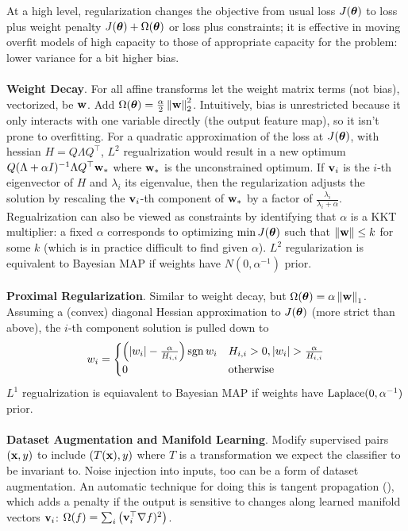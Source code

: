 \documentclass{article}
\begin{document}
At a high level, regularization changes the objective from usual loss $J({\boldsymbol\theta})$ to loss plus weight penalty $J({\boldsymbol\theta})+\Omega({\boldsymbol\theta})$ or loss plus constraints; it is effective in moving overfit models of high capacity to those of appropriate capacity for the problem: lower variance for a bit higher bias.
\\\\
\noindent
\textbf{Weight Decay}. For all affine transforms let the weight matrix terms (not bias), vectorized, be $\textbf{w}$. Add $\Omega({\boldsymbol\theta})=\frac{\alpha}{2}\left\| \textbf{w} \right\|_2^2$. Intuitively, bias is unrestricted because it only interacts with one variable directly (the output feature map), so it isn't prone to overfitting. For a quadratic approximation of the loss at $J({\boldsymbol\theta})$, with hessian $H=Q\Lambda Q^\top$, $L^2$ regualrization would result in a new optimum $Q(\Lambda+\alpha I)^{-1}\Lambda Q^\top \textbf{w}_*$ where $\textbf{w}_*$ is the unconstrained optimum. If $\textbf{v}_i$ is the $i$-th eigenvector of $H$ and $\lambda_i$ its eigenvalue, then the regularization adjusts the solution by rescaling the $\textbf{v}_i$-th component of $\textbf{w}_*$ by a factor of $\frac{\lambda_i}{\lambda_i+\alpha}$. Regualrization can also be viewed as constraints by identifying that $\alpha$ is a KKT multiplier: a fixed $\alpha$ corresponds to optimizing $\min J({\boldsymbol\theta})$ such that $\left\| \textbf{w} \right\|\le k$ for some $k$ (which is in practice difficult to find given $\alpha$). $L^2$ regularization is equivalent to Bayesian MAP if weights have $N(0,\alpha^{-1})$ prior.
\\\\
\noindent
\textbf{Proximal Regularization}. Similar to weight decay, but $\Omega({\boldsymbol\theta})=\alpha\left\| \textbf{w} \right\|_1$. Assuming a (convex) diagonal Hessian approximation to $J({\boldsymbol\theta})$ (more strict than above), the $i$-th component solution is pulled down to
$$w_i=\begin{cases}
\pa{\abs{w_i}-\frac{\alpha}{H_{i,i}}}\sgn w_i  & H_{i,i}>0, \abs{w_i}>\frac{\alpha}{H_{i,i}}\\
  0 & \text{otherwise}
\end{cases}$$
$L^1$ regualrization is equiavalent to Bayesian MAP if weights have $\operatorname{Laplace}(0, \alpha^{-1})$ prior.
\\\\
\noindent
\textbf{Dataset Augmentation and Manifold Learning}. Modify supervised pairs $(\textbf{x}, y)$ to include $(T(\textbf{x}), y)$ where $T$ is a transformation we expect the classifier to be invariant to. Noise injection into inputs, too can be a form of dataset augmentation. An automatic technique for doing this is tangent propagation (), which adds a penalty if the output is sensitive to changes along learned manifold vectors $\textbf{v}_i$: $\Omega(f)=\sum_i\left({\textbf{v}_i^\top\nabla f)^2}\right)$.
\end{document}
